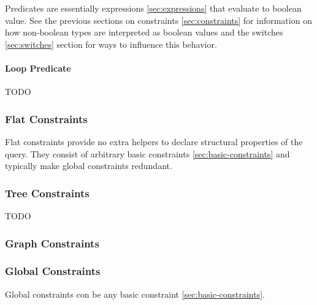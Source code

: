 \documentclass[11pt]{article}
\begin{document}
Predicates are essentially expressions \cref{sec:expressions} that evaluate to boolean value. See the previous sections on constraints \cref{sec:constraints} for information on how non-boolean types are interpreted as boolean values and the switches \cref{sec:switches} section for ways to influence this behavior.

\paragraph{Loop Predicate}

TODO

\subsubsection{Flat Constraints}
\label{sec:flat-constraints}

Flat constraints provide no extra helpers to declare structural properties of the query. They consist of arbitrary basic constraints \cref{sec:basic-constraints} and typically make global constraints redundant.

\subsubsection{Tree Constraints}
\label{sec:tree-constraints}

TODO

\subsubsection{Graph Constraints}
\label{sec:graph-constraints}


\subsubsection{Global Constraints}
\label{sec:global-constraints}

Global constraints con be any basic constraint \cref{sec:basic-constraints}.
\end{document}
